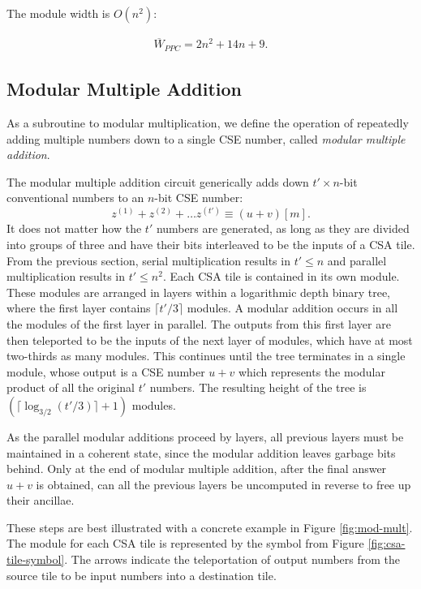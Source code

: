 The module width is $O(n^2)$:

\begin{eqnarray}
\overline{W}_{PPC} = 2n^2 + 14n + 9\text{.}
\end{eqnarray}

\subsection{Modular Multiple Addition}
\label{subsec:mma}

As a subroutine to modular multiplication, we define the operation of
repeatedly adding multiple numbers down to a single CSE number, called
\emph{modular multiple addition}.

The modular multiple addition circuit generically adds down $t'\times n$-bit
conventional numbers to an $n$-bit CSE number:
%
\begin{equation}
z^{(1)} + z^{(2)} + \ldots z^{(t')} \equiv (u+v)[m].
\end{equation}
%
It does not matter how the
$t'$ numbers are generated, as long as they are divided into groups of three
and have their bits interleaved to be the inputs of a CSA tile.
From the previous section, serial multiplication results in
$t' \le n$ and parallel multiplication results in $t' \le n^2$. Each CSA tile
is contained in its own module. These modules are arranged in layers within
a logarithmic depth binary tree, where 
the first layer contains $\lceil t'/3 \rceil$ modules. A modular addition
occurs in all the modules of the first layer in parallel. The outputs from this
first layer are then teleported to be the inputs of the next layer of modules,
which have at most two-thirds as many modules. This continues until the
tree terminates in a single module, whose output is a CSE number $u+v$ which
represents the modular product of all the original $t'$ numbers. The resulting
height of the tree is $(\lceil \log_{3/2}(t'/3) \rceil + 1)$ modules.

As the parallel modular additions proceed by layers, all previous layers
must be maintained in a coherent state, since the modular addition leaves
garbage bits behind. Only at the end of modular multiple addition, after
the final answer $u+v$ is obtained, can all the previous layers be
uncomputed in reverse to free up their ancillae.

These steps are best illustrated with a concrete
example in Figure \ref{fig:mod-mult}. The module for each CSA tile is
represented by the symbol from Figure \ref{fig:csa-tile-symbol}.
The arrows indicate the
teleportation of output numbers from the source tile to be input numbers
into a destination tile.

